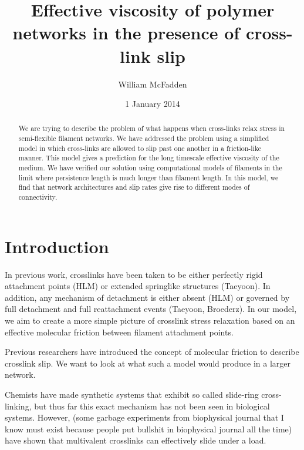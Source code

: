 \documentclass[prb,11pt]{revtex4-1}
\begin{document}
\title{Effective viscosity of polymer networks in the presence of cross-link slip}
\author{William McFadden}

\date{1 January 2014}

\begin{abstract}
We are trying to describe the problem of what happens when cross-links relax stress in semi-flexible filament networks.  We have addressed the problem using a simplified model in which cross-links are allowed to slip past one another in a friction-like manner.  This model gives a prediction for the long timescale effective viscosity of the medium.  We have verified our solution using computational models of filaments in the limit where persistence length is much longer than filament length.  In this model, we find that network architectures and slip rates give rise to different modes of connectivity.
\end{abstract}

\maketitle

\section{Introduction}

In previous work, crosslinks have been taken to be either perfectly rigid attachment points (HLM) or extended springlike structures (Taeyoon).  In addition, any mechanism of detachment is either absent (HLM) or governed by full detachment and full reattachment events (Taeyoon, Broederz).  In our model, we aim to create a more simple picture of crosslink stress relaxation based on an effective molecular friction between filament attachment points.

Previous researchers have introduced the concept of molecular friction to describe crosslink slip.  We want to look at what such a model would produce in a larger network.

Chemists have made synthetic systems that exhibit so called slide-ring cross-linking, but thus far this exact mechanism has not been seen in biological systems.  However, (some garbage experiments from biophysical journal that I know must exist because people put bullshit in biophysical journal all the time) have shown that multivalent crosslinks can effectively slide under a load.
\end{document}
